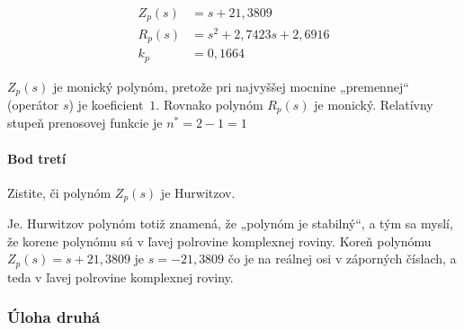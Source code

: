 \documentclass[a4paper, 10pt, ]{article}
\begin{document}
\smallskip



\begin{subequations}
    \begin{align}
        Z_p(s) &= s + 21,3809 \\
        R_p(s) &= s^2 + 2,7423 s + 2,6916 \\
        k_p &= 0,1664
    \end{align}
\end{subequations}

$Z_p(s)$ je monický polynóm, pretože pri najvyššej mocnine „premennej“ (operátor $s$) je koeficient~$1$. Rovnako polynóm $R_p(s)$ je monický. Relatívny stupeň prenosovej funkcie je $n^* = 2 - 1 = 1$








\paragraph{Bod tretí}

\smallskip

{\color{gray}

Zistite, či polynóm $Z_p(s)$ je Hurwitzov.

}

\smallskip


\noindent
Je. Hurwitzov polynóm totiž znamená, že „polynóm je stabilný“, a tým sa myslí, že korene polynómu sú v ľavej polrovine komplexnej roviny. Koreň polynómu $Z_p(s) = s + 21,3809$ je $s = -21,3809$ čo je na reálnej osi v záporných číslach, a teda v ľavej polrovine komplexnej roviny.






















\subsubsection{Úloha druhá}
\end{document}
